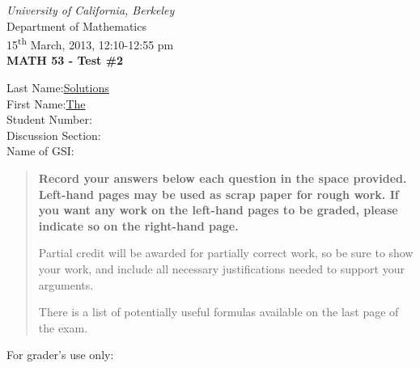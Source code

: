 \documentclass[12pt]{article}
\newcommand{\skipline}{\vspace{12pt}}
\begin{document}
\author{Instructor: Sean Fitzpatrick}
\thispagestyle{plain}
\begin{center}
\emph{University of California, Berkeley}\\
Department of Mathematics\\
15\textsuperscript{th} March, 2013, 12:10-12:55 pm\\
{\bf MATH 53 - Test \#2}\\
\end{center}
\skipline \skipline \skipline \noindent \skipline
Last Name:\underline{\hspace{100pt}Solutions\hspace{200pt}}\\
\skipline
First Name:\underline{\hspace{100pt}The\hspace{225pt}}\\
\skipline
Student Number:\underline{\hspace{322pt}}\\
\skipline
Discussion Section: \underline{\hspace{307pt}}\\
\skipline
Name of GSI: \underline{\hspace{336pt}}\\

\vspace{0.5in}


\begin{quote}
 {\bf Record your answers below each question in the space provided.    Left-hand pages may be used as scrap paper for rough work.  If you want any work on the left-hand pages to be graded, please indicate so on the right-hand page.
 
 \bigskip
 
Partial credit will be awarded for partially correct work, so be sure to show your work, and include all necessary justifications needed to support your arguments. 

There is a list of potentially useful formulas available on the last page of the exam.}
\end{quote}


\vspace{0.5in}

For grader's use only:
\end{document}
